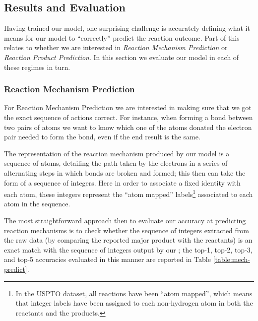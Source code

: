 
\subsection{Results and Evaluation}

Having trained our model, one surprising challenge is accurately defining what it means for our model to ``correctly'' predict the reaction outcome. 
Part of this relates to whether we are interested in  \emph{Reaction Mechanism Prediction} or \emph{Reaction Product Prediction}.  
In this section we evaluate our model in each of these regimes in turn.

\subsubsection{Reaction Mechanism Prediction}

 For Reaction Mechanism Prediction we are interested in making sure that we got the exact sequence of actions correct.
For instance, when forming a bond between two pairs of atoms we want to know which one of the atoms donated the electron pair needed to form the bond, even if the end result is the same. 

The representation of the reaction mechanism produced by our model is a sequence of atoms, detailing the path taken by the electrons in a series of alternating steps in which bonds are broken and formed; this then can take the form of a sequence of integers.
Here in order to associate a fixed identity with each atom, these integers represent the ``atom mapped'' labels\footnote{In the USPTO dataset, all reactions have been ``atom mapped'', which means that integer labels have been assigned to each non-hydrogen atom in both the reactants and the products.} associated to each atom in the sequence.

The most straightforward approach then to evaluate our accuracy at predicting reaction mechanisms is to check whether the sequence of integers extracted from the raw data (by comparing the reported major product with the reactants) is an exact match with the sequence of integers output by our \ourModel; the top-1, top-2, top-3, and top-5 accuracies evaluated in this manner are reported in Table \ref{table:mech-predict}.

